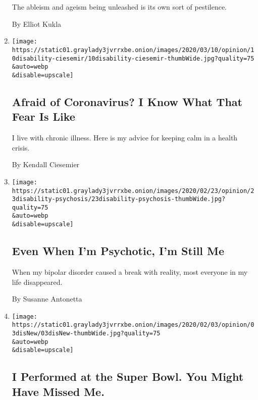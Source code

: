 \begin{enumerate}
  The ableism and ageism being unleashed is its own sort of pestilence.

  By Elliot Kukla
\item
  \href{/2020/03/10/opinion/coronavirus-disability-fear.html}{}

  \texttt{[image: https://static01.graylady3jvrrxbe.onion/images/2020/03/10/opinion/10disability-ciesemir/10disability-ciesemir-thumbWide.jpg?quality=75\\\&auto=webp\\\&disable=upscale]}

  \hypertarget{afraid-of-coronavirus-i-know-what-that-fear-is-like}{%
  \subsection{Afraid of Coronavirus? I Know What That Fear Is
  Like}\label{afraid-of-coronavirus-i-know-what-that-fear-is-like}}

  I live with chronic illness. Here is my advice for keeping calm in a
  health crisis.

  By Kendall Ciesemier
\item
  \href{/2020/02/21/opinion/sunday/bipolar-disorder-psychosis.html}{}

  \texttt{[image: https://static01.graylady3jvrrxbe.onion/images/2020/02/23/opinion/23disability-psychosis/23disability-psychosis-thumbWide.jpg?quality=75\\\&auto=webp\\\&disable=upscale]}

  \hypertarget{even-when-im-psychotic-im-still-me}{%
  \subsection{Even When I'm Psychotic, I'm Still
  Me}\label{even-when-im-psychotic-im-still-me}}

  When my bipolar disorder caused a break with reality, most everyone in
  my life disappeared.

  By Susanne Antonetta
\item
  \href{/2020/02/03/opinion/national-anthem-sign-language.html}{}

  \texttt{[image: https://static01.graylady3jvrrxbe.onion/images/2020/02/03/opinion/03disNew/03disNew-thumbWide.jpg?quality=75\\\&auto=webp\\\&disable=upscale]}

  \hypertarget{i-performed-at-the-super-bowl-you-might-have-missed-me}{%
  \subsection{I Performed at the Super Bowl. You Might Have Missed
  Me.}\label{i-performed-at-the-super-bowl-you-might-have-missed-me}}


\end{enumerate}
